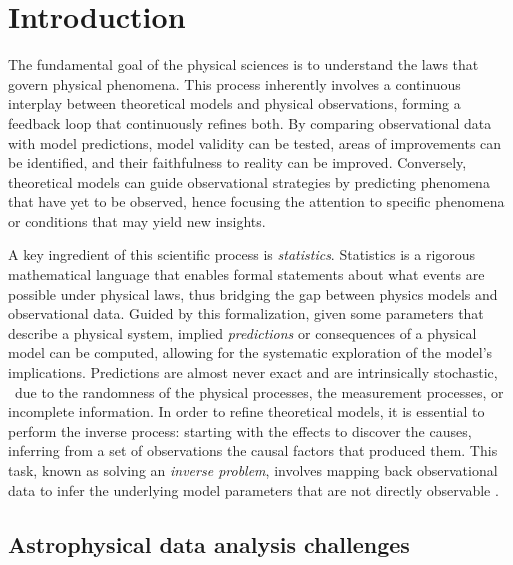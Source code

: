 \chapter{Introduction} \label{sec:introduction}

The fundamental goal of the physical sciences is to understand the laws that govern physical phenomena.
This process inherently involves a continuous interplay between theoretical models and physical observations, forming a feedback loop that continuously refines both. By comparing observational data with model predictions, model validity can be tested, areas of improvements can be identified, and their faithfulness to reality can be improved. Conversely, theoretical models can guide observational strategies by predicting phenomena that have yet to be observed, hence focusing the attention to specific phenomena or conditions that may yield new insights.

A key ingredient of this scientific process is \emph{statistics}. Statistics is a rigorous mathematical language that enables formal statements about what events are possible under physical laws, thus bridging the gap between physics models and observational data.
Guided by this formalization, given some parameters that describe a physical system, implied \emph{predictions} or consequences of a physical model can be computed, allowing for the systematic exploration of the model's implications. Predictions are almost never exact and are intrinsically stochastic, \eg\ due to the randomness of the physical processes, the measurement processes, or incomplete information.
In order to refine theoretical models, it is essential to perform the inverse process: starting with the effects to discover the causes, inferring from a set of observations the causal factors that produced them. This task, known as solving an \emph{inverse problem}, involves mapping back observational data to infer the underlying model parameters that are not directly observable \cite{Groetsch:1993, Aster:2005}.


\section{Astrophysical data analysis challenges}\label{sec:astro}

